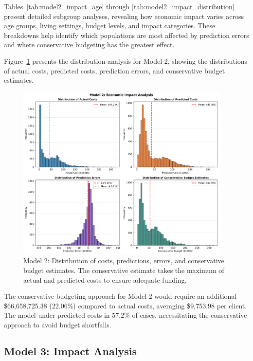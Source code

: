 Tables~\ref{tab:model2_impact_age} through \ref{tab:model2_impact_distribution} present detailed subgroup analyses, revealing how economic impact varies across age groups, living settings, budget levels, and impact categories. These breakdowns help identify which populations are most affected by prediction errors and where conservative budgeting has the greatest effect.

Figure~\ref{fig:model2_impact_histograms} presents the distribution analysis for Model 2, showing the distributions of actual costs, predicted costs, prediction errors, and conservative budget estimates.

\begin{figure}[htbp]
\centering
\includegraphics[width=0.95\textwidth]{figures/model_2_Impact_Histograms.pdf}
\caption{Model 2: Distribution of costs, predictions, errors, and conservative budget estimates. The conservative estimate takes the maximum of actual and predicted costs to ensure adequate funding.}
\label{fig:model2_impact_histograms}
\end{figure}

The conservative budgeting approach for Model 2 would require an additional \$66,658,725.38 (22.06\%) compared to actual costs, averaging \$9,753.98 per client. The model under-predicted costs in 57.2\% of cases, necessitating the conservative approach to avoid budget shortfalls. 

\clearpage

\subsection{Model 3: Impact Analysis}
\label{subsec:model3_impact}

